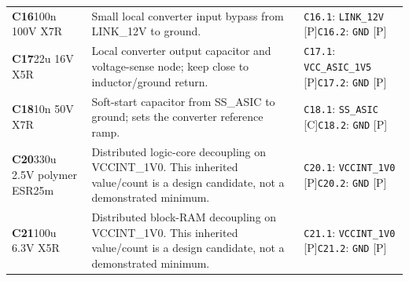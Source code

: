 \documentclass[11pt,a4paper]{article}
\begin{document}
\begin{longtable}{@{}P{27mm}P{83mm}P{58mm}@{}}
\textbf{C16}\newline 100n 100V X7R & Small local converter input bypass from LINK\_12V to ground. & \nolinkurl{C16.1}: \nolinkurl{LINK_12V} [P]\newline \nolinkurl{C16.2}: \nolinkurl{GND} [P] \\
\textbf{C17}\newline 22u 16V X5R & Local converter output capacitor and voltage-sense node; keep close to inductor/ground return. & \nolinkurl{C17.1}: \nolinkurl{VCC_ASIC_1V5} [P]\newline \nolinkurl{C17.2}: \nolinkurl{GND} [P] \\
\textbf{C18}\newline 10n 50V X7R & Soft-start capacitor from SS\_ASIC to ground; sets the converter reference ramp. & \nolinkurl{C18.1}: \nolinkurl{SS_ASIC} [C]\newline \nolinkurl{C18.2}: \nolinkurl{GND} [P] \\
\textbf{C20}\newline 330u 2.5V polymer ESR25m & Distributed logic-core decoupling on VCCINT\_1V0. This inherited value/count is a design candidate, not a demonstrated minimum. & \nolinkurl{C20.1}: \nolinkurl{VCCINT_1V0} [P]\newline \nolinkurl{C20.2}: \nolinkurl{GND} [P] \\
\textbf{C21}\newline 100u 6.3V X5R & Distributed block-RAM decoupling on VCCINT\_1V0. This inherited value/count is a design candidate, not a demonstrated minimum. & \nolinkurl{C21.1}: \nolinkurl{VCCINT_1V0} [P]\newline \nolinkurl{C21.2}: \nolinkurl{GND} [P] \\

\end{longtable}
\end{document}

